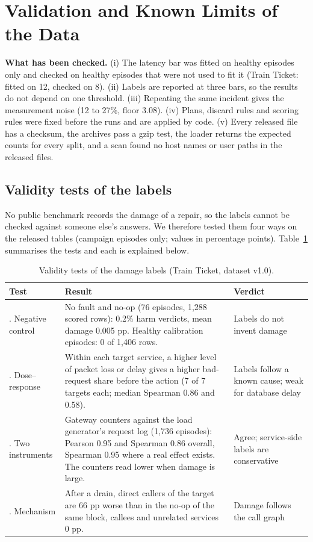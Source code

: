 \section{Validation and Known Limits of the Data}
\textbf{What has been checked.} (i) The latency bar was fitted on healthy episodes only and checked on healthy episodes that were not used to fit it (Train Ticket: fitted on 12, checked on 8). (ii) Labels are reported at three bars, so the results do not depend on one threshold. (iii) Repeating the same incident gives the measurement noise (12 to 27\%, floor 3.08). (iv) Plans, discard rules and scoring rules were fixed before the runs and are applied by code. (v) Every released file has a checksum, the archives pass a gzip test, the loader returns the expected counts for every split, and a scan found no host names or user paths in the released files.

\subsection{Validity tests of the labels}
No public benchmark records the damage of a repair, so the labels cannot be checked against someone else's answers. We therefore tested them four ways on the released tables (campaign episodes only; values in percentage points). Table~\ref{tab:valid} summarises the tests and each is explained below.

\begin{table}[H]
\centering
\caption{Validity tests of the damage labels (Train Ticket, dataset v1.0).}
\label{tab:valid}
\small
\begin{tabularx}{\textwidth}{>{\raggedright\arraybackslash}p{2.6cm}>{\raggedright\arraybackslash}XX}
\toprule
Test & Result & Verdict \\
\midrule
1. Negative control & No fault and no-op (76 episodes, 1,288 scored rows): 0.2\% harm verdicts, mean damage 0.005 pp. Healthy calibration episodes: 0 of 1,406 rows. & Labels do not invent damage \\
2. Dose--response & Within each target service, a higher level of packet loss or delay gives a higher bad-request share before the action (7 of 7 targets each; median Spearman 0.86 and 0.58). & Labels follow a known cause; weak for database delay \\
3. Two instruments & Gateway counters against the load generator's request log (1,736 episodes): Pearson 0.95 and Spearman 0.86 overall, Spearman 0.95 where a real effect exists. The counters read lower when damage is large. & Agree; service-side labels are conservative \\
4. Mechanism & After a drain, direct callers of the target are 66 pp worse than in the no-op of the same block, callees and unrelated services 0 pp. & Damage follows the call graph \\
\bottomrule
\end{tabularx}
\end{table}

